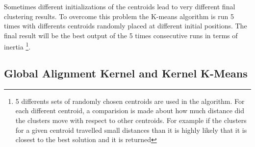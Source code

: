 \documentclass[11pt]{article}
\begin{document}
    Sometimes different initializations of the centroids lead to very
different final clustering results. To overcome this problem the K-means
algorithm is run 5 times with differents centroids randomly placed at
different initial positions. The final result will be the best output of
the 5 times consecutive runs in terms of inertia
\footnote {5 differents sets of randomly chosen centroids are used in the algorithm. For each different centroid, a comparision is made about how much distance did the clusters move with respect to other centroids. For example if the clusters for a given centroid travelled small distances than it is highly likely that it is closest to the best solution and it is returned}.

    \subsection{Global Alignment Kernel and Kernel K-Means}
\end{document}
